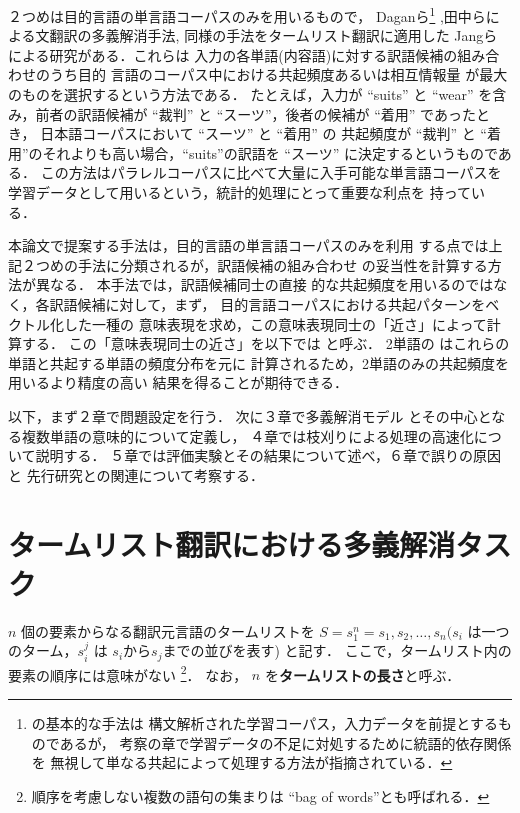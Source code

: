   ２つめは目的言語の単言語コーパスのみを用いるもので，
Daganら\cite{Dagan94}\footnote{\cite{Dagan94}の基本的な手法は
構文解析された学習コーパス，入力データを前提とするものであるが，
考察の章で学習データの不足に対処するために統語的依存関係を
無視して単なる共起によって処理する方法が指摘されている．}
,田中ら\cite{Tanaka96}による文翻訳の多義解消手法, 
同様の手法をタームリスト翻訳に適用した 
Jangら\cite{Jang99} による研究がある．これらは
入力の各単語(内容語)に対する訳語候補の組み合わせのうち目的
言語のコーパス中における共起頻度あるいは相互情報量
が最大のものを選択するという方法である． 
たとえば，入力が ``suits'' と  ``wear'' を含み，前者の訳語候補が
``裁判'' と ``スーツ''，後者の候補が ``着用'' であったとき，
日本語コーパスにおいて  ``スーツ'' と  ``着用'' の 共起頻度が
``裁判'' と  ``着用''のそれよりも高い場合，``suits''の訳語を
``スーツ'' に決定するというものである．
この方法はパラレルコーパスに比べて大量に入手可能な単言語コーパスを
学習データとして用いるという，統計的処理にとって重要な利点を
持っている．

本論文で提案する手法は，目的言語の単言語コーパスのみを利用
する点では上記２つめの手法に分類されるが，訳語候補の組み合わせ
の妥当性を計算する方法が異なる． 本手法では，訳語候補同士の直接
的な共起頻度を用いるのではなく，各訳語候補に対して，まず，
目的言語コーパスにおける共起パターンをベクトル化した一種の
意味表現を求め，この意味表現同士の「近さ」によって計算する． 
この「意味表現同士の近さ」を以下では \kanren と呼ぶ． 
2単語の \kanren はこれらの単語と共起する単語の頻度分布を元に
計算されるため，2単語のみの共起頻度を用いるより精度の高い
結果を得ることが期待できる．

以下，まず２章で問題設定を行う． 次に３章で多義解消モデル
とその中心となる複数単語の意味的\kanren について定義し，
４章では枝刈りによる処理の高速化について説明する．
５章では評価実験とその結果について述べ，６章で誤りの原因と
先行研究との関連について考察する．

\section{タームリスト翻訳における多義解消タスク}
 
  $n$ 個の要素からなる翻訳元言語のタームリストを 
$ S = s_1^n = s_1, s_2, \ldots, s_n (s_i $ は一つのターム，$s_i^j$ 
は $s_i から s_j $までの並びを表す) と記す． 
ここで，タームリスト内の要素の順序には意味がない
\footnote{順序を考慮しない複数の語句の集まりは
``bag of words''とも呼ばれる．}．
なお， $n$ を{\bf タームリストの長さ}と呼ぶ． 

